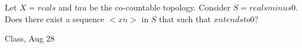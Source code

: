 \begin{samepage}
\begin{ex}
Let $X = reals$ and $tau$ be the co-countable topology. Consider $S = reals minus {{ 0 }}$.
Does there exist a sequence $< xn >$ in $S$ that such that $xn tends to 0$?
\end{ex}
\begin{source}
Class, Aug 28
\end{source}
\end{samepage}
